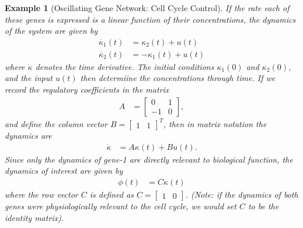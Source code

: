 \documentclass[9 pt]{article}
\newcommand{\1}{\mathbbm{1}}
\newtheorem{example}{Example}
\begin{document}
\begin{example}[Oscillating Gene Network: Cell Cycle Control]
    If the rate each of these genes is expressed is a linear function of their concentrations, the dynamics of the system are given by
    \begin{align*}
      \dot{\kappa_{1}}(t) &= \kappa_{2}(t) + u(t) \\
      \dot{\kappa_{2}}(t) &= - \kappa_{1}(t) + u(t)
    \end{align*}
    where $\dot{\kappa}$ denotes the time derivative. The initial conditions $\kappa_{1}(0)$ and $\kappa_{2}(0)$, and the input $u(t)$ then determiine the concentrations through time. If we record the regulatory coefficients in the matrix
    \begin{align*}
      A &= \begin{bmatrix} 0 & 1 \\ -1 & 0 \end{bmatrix} ,
    \end{align*}
    and define the column vector $B = \begin{bmatrix} 1 & 1 \end{bmatrix}^{T}$, then in matrix notation the dynamics are
      \begin{align*}
      \dot{\kappa} &= A \kappa(t) + B u(t) .
      \end{align*}
      Since only the dynamics of gene-1 are directly relevant to biological function, the dynamics of interest are given by
      \begin{align*}
      \phi(t) &= C \kappa (t)
      \end{align*}
      where the row vector $C$ is defined as $C = \begin{bmatrix} 1 & 0 \end{bmatrix}$. (Note: if the dynamics of both genes were physiologically relevant to the cell cycle, we would set $C$ to be the identity matrix).

\end{example}
\end{document}
